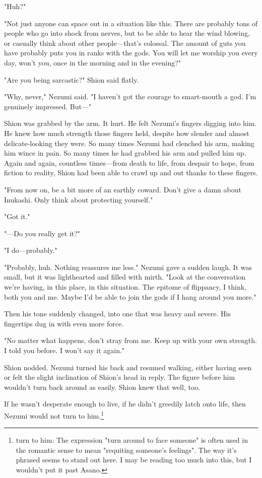 "Huh?"

"Not just anyone can space out in a situation like this. There are
probably tons of people who go into shock from nerves, but to be able to
hear the wind blowing, or casually think about other people---that's
colossal. The amount of guts you have probably puts you in ranks with
the gods. You will let me worship you every day, won't you, once in the
morning and in the evening?"

"Are you being sarcastic?" Shion said flatly.

"Why, never," Nezumi said. "I haven't got the courage to smart-mouth a
god. I'm genuinely impressed. But---"

Shion was grabbed by the arm. It hurt. He felt Nezumi's fingers digging
into him. He knew how much strength those fingers held, despite how
slender and almost delicate-looking they were. So many times Nezumi had
clenched his arm, making him wince in pain. So many times he had grabbed
his arm and pulled him up. Again and again, countless times---from death
to life, from despair to hope, from fiction to reality, Shion had been
able to crawl up and out thanks to these fingers.

"From now on, be a bit more of an earthly coward. Don't give a damn
about Inukashi. Only think about protecting yourself."

"Got it."

"---Do you really get it?"

"I do---probably."

"Probably, huh. Nothing reassures me less." Nezumi gave a sudden laugh.
It was small, but it was lighthearted and filled with mirth. "Look at
the conversation we're having, in this place, in this situation. The
epitome of flippancy, I think, both you and me. Maybe I'd be able to
join the gods if I hang around you more."

Then his tone suddenly changed, into one that was heavy and severe. His
fingertips dug in with even more force.

"No matter what happens, don't stray from me. Keep up with your own
strength. I told you before. I won't say it again."

Shion nodded. Nezumi turned his back and resumed walking, either having
seen or felt the slight inclination of Shion's head in reply. The figure
before him wouldn't turn back around as easily. Shion knew that well,
too.

If he wasn't desperate enough to live, if he didn't greedily latch onto
life, then Nezumi would not turn to him.\footnote{turn to him: The expression "turn around to face someone" is often used in the romantic sense to mean "requiting someone's feelings". The way it's phrased seems to stand out here. I may be reading too much into this, but I wouldn't put it past Asano.}


